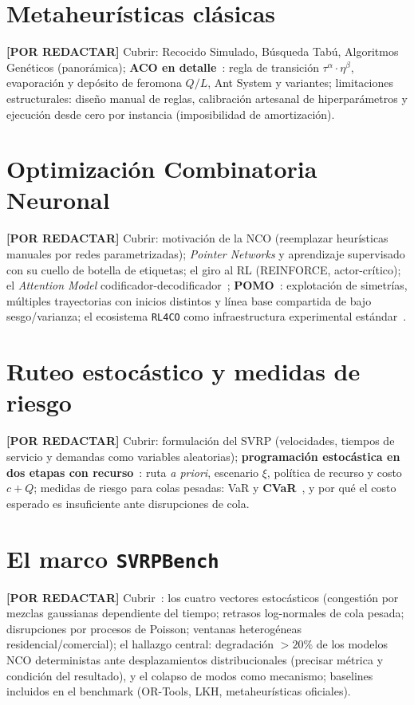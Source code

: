 \documentclass[12pt]{report}
\newcommand{\pendiente}[1]{\par\noindent\colorbox{lightbg}{%
  \begin{minipage}{0.94\linewidth}\small
  \textcolor{uanlgold}{\textbf{[POR REDACTAR]}} #1
  \end{minipage}}\par\medskip}
\begin{document}
\section{Metaheur\'isticas cl\'asicas}\label{sec:metaheuristicas}
\pendiente{Cubrir: Recocido Simulado, B\'usqueda Tab\'u, Algoritmos Gen\'eticos
(panor\'amica); \textbf{ACO en detalle}~\cite{Dorigo1996AntSystem}: regla de
transici\'on $\tau^{\alpha}\cdot\eta^{\beta}$, evaporaci\'on y dep\'osito de
feromona $Q/L$, Ant System y variantes; limitaciones estructurales: dise\~no
manual de reglas, calibraci\'on artesanal de hiperpar\'ametros y ejecuci\'on
desde cero por instancia (imposibilidad de amortizaci\'on).}

\section{Optimizaci\'on Combinatoria Neuronal}\label{sec:nco}
\pendiente{Cubrir: motivaci\'on de la NCO (reemplazar heur\'isticas manuales por
redes parametrizadas); \textit{Pointer Networks} y aprendizaje supervisado con
su cuello de botella de etiquetas; el giro al RL (REINFORCE, actor-cr\'itico);
el \textit{Attention Model} codificador-decodificador~\cite{Kool2019Attention};
\textbf{POMO}~\cite{Kwon2020POMO}: explotaci\'on de simetr\'ias, m\'ultiples
trayectorias con inicios distintos y l\'inea base compartida de bajo
sesgo/varianza; el ecosistema \texttt{RL4CO} como infraestructura experimental
est\'andar~\cite{Berto2023RL4CO}.}

\section{Ruteo estoc\'astico y medidas de riesgo}\label{sec:svrp}
\pendiente{Cubrir: formulaci\'on del SVRP (velocidades, tiempos de servicio y
demandas como variables aleatorias); \textbf{programaci\'on estoc\'astica en dos
etapas con recurso}~\cite{Gendreau1996Stochastic}: ruta \emph{a priori},
escenario $\xi$, pol\'itica de recurso y costo $c+Q$; medidas de riesgo para
colas pesadas: VaR y \textbf{CVaR}~\cite{Rockafellar2000CVaR}, y por qu\'e el
costo esperado es insuficiente ante disrupciones de cola.}

\section{El marco \texttt{SVRPBench}}\label{sec:svrpbench}
\pendiente{Cubrir~\cite{Heakl2025SVRP}: los cuatro vectores estoc\'asticos
(congesti\'on por mezclas gaussianas dependiente del tiempo; retrasos
log-normales de cola pesada; disrupciones por procesos de Poisson; ventanas
heterog\'eneas residencial/comercial); el hallazgo central: degradaci\'on
$>20\%$ de los modelos NCO deterministas ante desplazamientos distribucionales
(precisar m\'etrica y condici\'on del resultado), y el colapso de modos como
mecanismo; baselines incluidos en el benchmark (OR-Tools, LKH, metaheur\'isticas
oficiales).}
\end{document}

